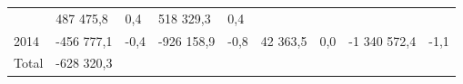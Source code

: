 \begin{longtable}[]{@{}lllllllll@{}}
\begin{minipage}[t]{0.06\columnwidth}
\end{minipage} & \begin{minipage}[t]{0.12\columnwidth}\raggedright
487 475,8\strut
\end{minipage} & \begin{minipage}[t]{0.06\columnwidth}\raggedright
0,4\strut
\end{minipage} & \begin{minipage}[t]{0.10\columnwidth}\raggedright
518 329,3\strut
\end{minipage} & \begin{minipage}[t]{0.06\columnwidth}\raggedright
0,4\strut
\end{minipage}\tabularnewline
\begin{minipage}[t]{0.05\columnwidth}\raggedright
2014\strut
\end{minipage} & \begin{minipage}[t]{0.10\columnwidth}\raggedright
-456 777,1\strut
\end{minipage} & \begin{minipage}[t]{0.06\columnwidth}\raggedright
-0,4\strut
\end{minipage} & \begin{minipage}[t]{0.16\columnwidth}\raggedright
-926 158,9\strut
\end{minipage} & \begin{minipage}[t]{0.06\columnwidth}\raggedright
-0,8\strut
\end{minipage} & \begin{minipage}[t]{0.12\columnwidth}\raggedright
42 363,5\strut
\end{minipage} & \begin{minipage}[t]{0.06\columnwidth}\raggedright
0,0\strut
\end{minipage} & \begin{minipage}[t]{0.10\columnwidth}\raggedright
-1 340 572,4\strut
\end{minipage} & \begin{minipage}[t]{0.06\columnwidth}\raggedright
-1,1\strut
\end{minipage}\tabularnewline
\begin{minipage}[t]{0.05\columnwidth}\raggedright
Total\strut
\end{minipage} & \begin{minipage}[t]{0.10\columnwidth}\raggedright
-628 320,3\strut
\end{minipage} & \begin{minipage}[t]{0.06\columnwidth}\raggedright
\strut
\end{minipage} & \begin{minipage}[t]{0.16\columnwidth}\raggedright

\end{minipage}
\end{longtable}
